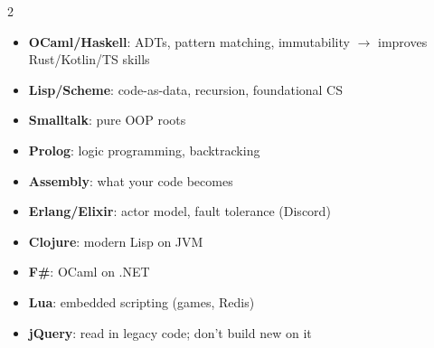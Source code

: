 \documentclass[11pt, letterpaper]{article}
\begin{document}
\begin{tcolorbox}[colback=part5bg, colframe=sectionteal,
  title={\bfseries Languages to Study (but maybe not pick)}, arc=3pt, boxrule=1pt]
\footnotesize
\begin{multicols}{2}
\begin{itemize}[noitemsep, leftmargin=*]
  \item \textbf{OCaml/Haskell}: ADTs, pattern matching, immutability $\to$ improves Rust/Kotlin/TS skills
  \item \textbf{Lisp/Scheme}: code-as-data, recursion, foundational CS
  \item \textbf{Smalltalk}: pure OOP roots
  \item \textbf{Prolog}: logic programming, backtracking
  \item \textbf{Assembly}: what your code becomes
\end{itemize}
\columnbreak
\begin{itemize}[noitemsep, leftmargin=*]
  \item \textbf{Erlang/Elixir}: actor model, fault tolerance (Discord)
  \item \textbf{Clojure}: modern Lisp on JVM
  \item \textbf{F\#}: OCaml on .NET
  \item \textbf{Lua}: embedded scripting (games, Redis)
  \item \textbf{jQuery}: read in legacy code; don't build new on it
\end{itemize}
\end{multicols}
\end{tcolorbox}
\end{document}
